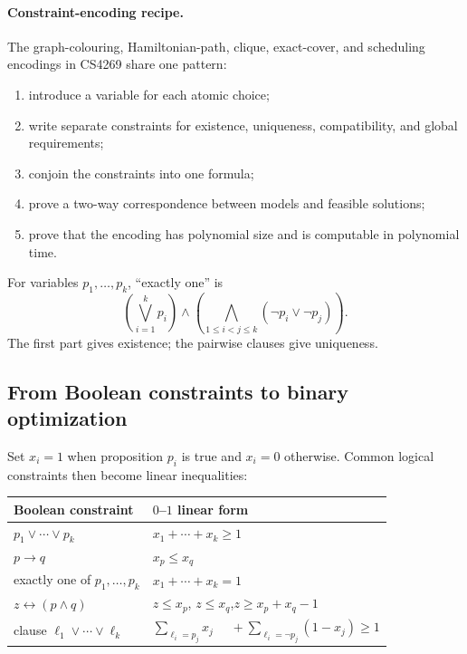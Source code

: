 \documentclass[8pt]{extarticle}
\theoremstyle{definition}
\begin{document}
\begin{multicols*}{2}
\paragraph{Constraint-encoding recipe.}
The graph-colouring, Hamiltonian-path, clique, exact-cover, and scheduling
encodings in CS4269 share one pattern:
\begin{enumerate}
  \item introduce a variable for each atomic choice;
  \item write separate constraints for existence, uniqueness, compatibility,
        and global requirements;
  \item conjoin the constraints into one formula;
  \item prove a two-way correspondence between models and feasible solutions;
  \item prove that the encoding has polynomial size and is computable in
        polynomial time.
\end{enumerate}
For variables $p_1,\ldots,p_k$, ``exactly one'' is
\[
  \left(\bigvee_{i=1}^k p_i\right)
  \land
  \left(\bigwedge_{1\le i<j\le k}(\neg p_i\lor\neg p_j)\right).
\]
The first part gives existence; the pairwise clauses give uniqueness.

\subsection{From Boolean constraints to binary optimization}

Set $x_i=1$ when proposition $p_i$ is true and $x_i=0$ otherwise.  Common
logical constraints then become linear inequalities:

\begin{center}
\small
\setlength{\tabcolsep}{3pt}
\begin{tabularx}{\linewidth}{@{}Y{0.85}Y{1.15}@{}}
\toprule
Boolean constraint & $0$--$1$ linear form \\
\midrule
$p_1\lor\cdots\lor p_k$
  & $x_1+\cdots+x_k\ge1$ \\
$p\rightarrow q$
  & $x_p\le x_q$ \\
exactly one of $p_1,\ldots,p_k$
  & $x_1+\cdots+x_k=1$ \\
$z\leftrightarrow(p\land q)$
  & $z\le x_p$, $z\le x_q$,\newline $z\ge x_p+x_q-1$ \\
clause $\ell_1\lor\cdots\lor\ell_k$
  & $\sum_{\ell_i=p_j}x_j$\newline
    $\quad+\sum_{\ell_i=\neg p_j}(1-x_j)\ge1$ \\
\bottomrule
\end{tabularx}
\end{center}


\end{multicols*}
\end{document}
